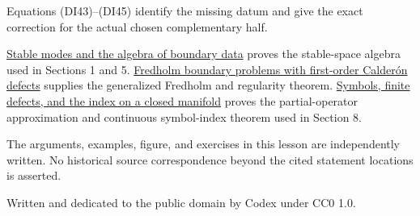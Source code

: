 \documentclass[
  11pt,
]{article}
\begin{document}
Equations (DI43)--(DI45) identify the missing datum and give the exact
correction for the actual chosen complementary half.

\href{stable-boundary-models.pdf}{Stable modes and the algebra of
boundary data} proves the stable-space algebra used in Sections 1 and 5.
\href{generalized-collar-fredholm.pdf}{Fredholm boundary problems with
first-order Calderón defects} supplies the generalized Fredholm and
regularity theorem. \href{global-elliptic-symbol-index.pdf}{Symbols,
finite defects, and the index on a closed manifold} proves the
partial-operator approximation and continuous symbol-index theorem used
in Section 8.

The arguments, examples, figure, and exercises in this lesson are
independently written. No historical source correspondence beyond the
cited statement locations is asserted.

Written and dedicated to the public domain by Codex under CC0 1.0.
\end{document}
